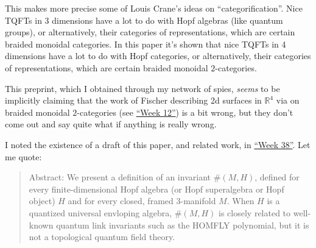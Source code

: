 \documentclass[12pt]{article}
\def\tightlist{}
\renewcommand{\texttt}[1]{%
  \begingroup
  \ttfamily
  \begingroup\lccode`~=`/\lowercase{\endgroup\def~}{/\discretionary{}{}{}}%
  \begingroup\lccode`~=`[\lowercase{\endgroup\def~}{[\discretionary{}{}{}}%
  \begingroup\lccode`~=`.\lowercase{\endgroup\def~}{.\discretionary{}{}{}}%
  \catcode`/=\active\catcode`[=\active\catcode`.=\active
  \scantokens{#1\noexpand}%
  \endgroup
}
\begin{document}
\noindent
This makes more precise some of Louis Crane's ideas on
``categorification''. Nice TQFTs in 3 dimensions have a lot to do with
Hopf algebras (like quantum groups), or alternatively, their categories
of representations, which are certain braided monoidal categories. In
this paper it's shown that nice TQFTs in 4 dimensions have a lot to do
with Hopf categories, or alternatively, their categories of
representations, which are certain braided monoidal \(2\)-categories.

\noindent
This preprint, which I obtained through my network of spies,
\emph{seems} to be implicitly claiming that the work of Fischer
describing 2d surfaces in \(\mathbb{R}^4\) via on braided monoidal
\(2\)-categories (see \protect\hyperlink{week12}{``Week 12''}) is a bit
wrong, but they don't come out and say quite what if anything is really
wrong.

\noindent
I noted the existence of a draft of this paper, and related work, in
\protect\hyperlink{week38}{``Week 38''}. Let me quote:

\begin{quote}
Abstract: We present a definition of an invariant \(\#(M,H)\), defined
for every finite-dimensional Hopf algebra (or Hopf superalgebra or Hopf
object) \(H\) and for every closed, framed 3-manifold \(M\). When \(H\)
is a quantized universal envloping algebra, \(\#(M,H)\) is closely
related to well-known quantum link invariants such as the HOMFLY
polynomial, but it is not a topological quantum field theory.
\end{quote}
\end{document}
